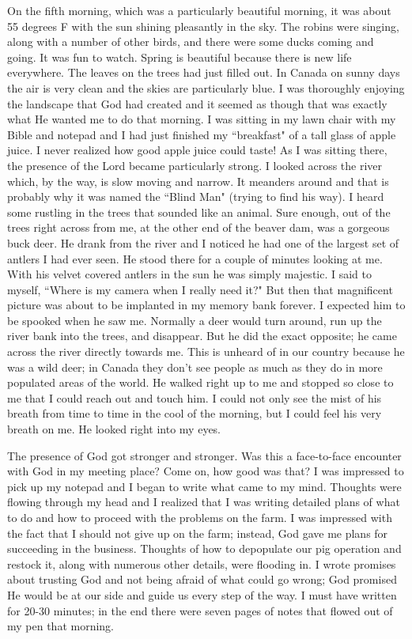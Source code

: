 \documentclass[oneside]{book}
\begin{document}
On the fifth morning, which was a particularly beautiful morning, it was about 55 degrees F with the sun shining pleasantly in the sky. The robins were singing, along with a number of other birds, and there were some ducks coming and going. It was fun to watch. Spring is beautiful because there is new life everywhere. The leaves on the trees had just filled out. In Canada on sunny days the air is very clean and the skies are particularly blue. I was thoroughly enjoying the landscape that God had created and it seemed as though that was exactly what He wanted me to do that morning. I was sitting in my lawn chair with my Bible and notepad and I had just finished my ``breakfast" of a tall glass of apple juice. I never realized how good apple juice could taste! As I was sitting there, the presence of the Lord became particularly strong. I looked across the river which, by the way, is slow moving and narrow. It meanders around and that is probably why it was named the ``Blind Man" (trying to find his way). I heard some rustling in the trees that sounded like an animal. Sure enough, out of the trees right across from me, at the other end of the beaver dam, was a gorgeous buck deer. He drank from the river and I noticed he had one of the largest set of antlers I had ever seen. He stood there for a couple of minutes looking at me. With his velvet covered antlers in the sun he was simply majestic. I said to myself, ``Where is my camera when I really need it?" But then that magnificent picture was about to be implanted in my memory bank forever. I expected him to be spooked when he saw me. Normally a deer would turn around, run up the river bank into the trees, and disappear. But he did the exact opposite; he came across the river directly towards me. This is unheard of in our country because he was a wild deer; in Canada they don't see people as much as they do in more populated areas of the world. He walked right up to me and stopped so close to me that I could reach out and touch him. I could not only see the mist of his breath from time to time in the cool of the morning, but I could feel his very breath on me. He looked right into my eyes. 

The presence of God got stronger and stronger. Was this a face-to-face encounter with God in my meeting place? Come on, how good was that? I was impressed to pick up my notepad and I began to write what came to my mind. Thoughts were flowing through my head and I realized that I was writing detailed plans of what to do and how to proceed with the problems on the farm. I was impressed with the fact that I should not give up on the farm; instead, God gave me plans for succeeding in the business. Thoughts of how to depopulate our pig operation and restock it, along with numerous other details, were flooding in. I wrote promises about trusting God and not being afraid of what could go wrong; God promised He would be at our side and guide us every step of the way. I must have written for 20-30 minutes; in the end there were seven pages of notes that flowed out of my pen that morning. 
\end{document}
